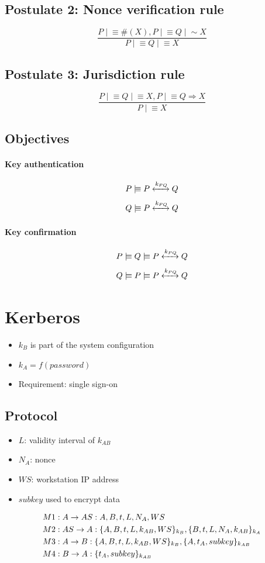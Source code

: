 \documentclass[a4paper,12pt]{article}
\newcommand{\believes}{\mid\!\equiv}
\newcommand{\oncesaid}{\mid\!\sim}
\newcommand{\controls}{\Rightarrow}
\newcommand{\fresh}[1]{\#(#1)}
\newcommand{\sharekey}[1]{\xleftrightarrow{#1}}
\begin{document}
\subsection{Postulate 2: Nonce verification rule}
\[\frac{P \believes \fresh{X}, P \believes Q \oncesaid X}{P \believes Q \believes X}\]

\subsection{Postulate 3: Jurisdiction rule}
\[\frac{P \believes Q \believes X, P \believes Q \controls X}{P \believes X}\]

\subsection{Objectives}
\paragraph{Key authentication}
\[P \believes P \sharekey{k_{PQ}} Q\]
\[Q \believes P \sharekey{k_{PQ}} Q\]
\paragraph{Key confirmation}
\[P \believes Q \believes P \sharekey{k_{PQ}} Q\]
\[Q \believes P \believes P \sharekey{k_{PQ}} Q\]

\section{Kerberos}
\begin{itemize}
	\item $k_B$ is part of the system configuration
	\item $k_A = f(password)$
	\item Requirement: single sign-on 
\end{itemize}

\subsection{Protocol}
\begin{itemize}
	\item $L$: validity interval of $k_{AB}$
	\item $N_A$: nonce
	\item $WS$: workstation IP address
	\item $subkey$ used to encrypt data
\end{itemize}
\begin{align}
&M1: A \to AS: A,B,t,L,N_A,WS \notag \\
&M2: AS \to A: \{A,B,t,L,k_{AB},WS\}_{k_B}, \{B,t,L,N_A,k_{AB}\}_{k_A} \notag \\
&M3: A \to B: \{A,B,t,L,k_{AB},WS\}_{k_B}, \{A,t_A, subkey\}_{k_{AB}} \notag \\
&M4: B \to A: \{t_A, subkey\}_{k_{AB}} \notag
\end{align}
\end{document}
